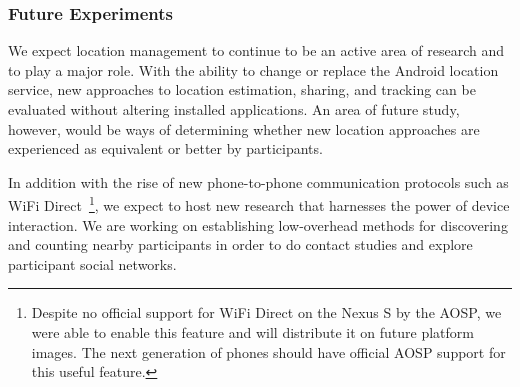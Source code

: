 \subsubsection{Future Experiments}

We expect location management to continue to be an active area of research
and \PhoneLab{} to play a major role. With the ability to change or replace
the Android location service, new approaches to location estimation, sharing,
and tracking can be evaluated without altering installed applications. An
area of future study, however, would be ways of determining whether new
location approaches are experienced as equivalent or better by \PhoneLab{}
participants.

In addition with the rise of new phone-to-phone communication protocols such
as WiFi Direct~\cite{wifi-direct}\footnote{Despite no official support for WiFi
Direct on the Nexus S by the AOSP, we were able to enable this feature and
will distribute it on future platform images. The next generation of
\PhoneLab{} phones should have official AOSP support for this useful
feature.}, we expect \PhoneLab{} to host new research that harnesses the
power of device interaction. We are working on establishing low-overhead
methods for discovering and counting nearby \PhoneLab{} participants in order
to do contact studies and explore participant social networks.
